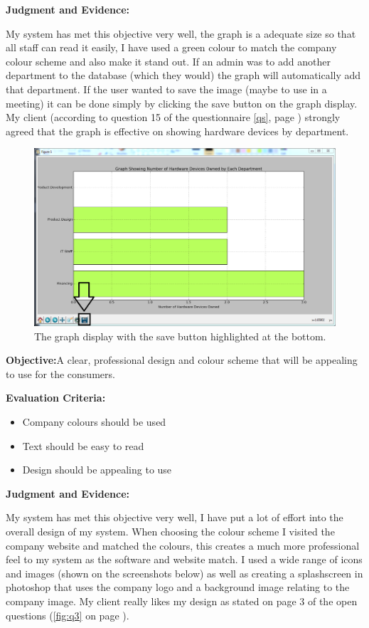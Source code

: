 \textbf{Judgment and Evidence:}

My system has met this objective very well, the graph is a adequate size so that all staff can read it easily, I have used a green colour to match the company colour scheme and also make it stand out. If an admin was to add another department to the database (which they would) the graph will automatically add that department. If the user wanted to save the image (maybe to use in a meeting) it can be done simply by clicking the save button on the graph display. My client (according to question 15 of the questionnaire \ref{qs}, page \pageref{qs}) strongly agreed that the graph is effective on showing hardware devices by department.

\begin{figure}[H]
    \includegraphics[width=\textwidth]{./Manual/Images/graph2.png}
    \caption{The graph display with the save button highlighted at the bottom.} 
\end{figure}

\textbf{Objective:}A clear, professional design and colour scheme that will be appealing to use for the consumers.

\textbf{Evaluation Criteria:}
\begin{itemize}
\item{Company colours should be used}
\item{Text should be easy to read}
\item{Design should be appealing to use}
\end{itemize}

\textbf{Judgment and Evidence:}

My system has met this objective very well, I have put a lot of effort into the overall design of my system. When choosing the colour scheme I visited the company website and matched the colours, this creates a much more professional feel to my system as the software and website match. I used a wide range of icons and images (shown on the screenshots below) as well as creating a splashscreen in photoshop that uses the company logo and a background image relating to the company image. My client really likes my design as stated on page 3 of the open questions (\ref{fig:q3} on page \pageref{fig:q3}).

